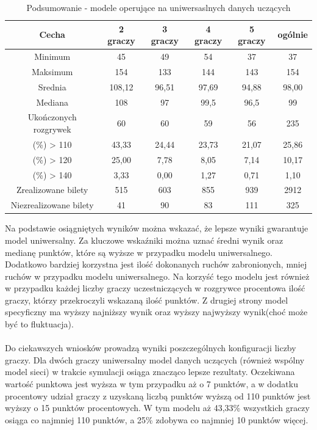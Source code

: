\documentclass[12pt, oneside]{report}
\begin{document}
\begin{table}[h]
	\begin{center}
		\begin{tabular}{| c | c | c | c | c | c |} \hline
			Cecha & 2 graczy & 3 graczy & 4 graczy & 5 graczy & ogólnie \\ \hline
			Minimum & 45 & 49 & 54 & 37 & 37 \\ \hline
			Maksimum & 154 & 133 & 144 & 143 & 154 \\ \hline
			Srednia & 108,12 & 96,51 & 97,69 & 94,88 & 98,00 \\ \hline
			Mediana & 108 & 97 & 99,5 & 96,5 & 99 \\ \hline
			Ukończonych rozgrywek & 60 & 60 & 59 & 56 & 235 \\ \hline
			(\%) > 110 & 43,33 & 24,44 & 23,73 & 21,07 & 25,86 \\ \hline
			(\%) > 120 & 25,00 & 7,78 & 8,05 & 7,14 & 10,17 \\ \hline
			(\%) > 140 & 3,33 & 0,00 & 1,27 & 0,71 & 1,10 \\ \hline
			Zrealizowane bilety & 515 & 603 & 855 & 939 & 2912 \\ \hline
			Niezrealizowane bilety & 41 & 90 & 83 & 111 & 325 \\ \hline
		\end{tabular}
		\caption{Podsumowanie - modele operujące na uniwersaslnych danych uczących}
		\label{table:nn_all_test}
	\end{center}
\end{table}
Na podstawie osiągniętych wyników można wskazać, że lepsze wyniki gwarantuje model uniwersalny. Za kluczowe wskaźniki można uznać średni wynik oraz medianę punktów, które są wyższe w przypadku modelu uniwersalnego. Dodatkowo bardziej korzystna jest ilość dokonanych ruchów zabronionych, mniej ruchów w przypadku modelu uniwersalnego. Na korzyść tego modelu jest również w przypadku każdej liczby graczy uczestniczących w rozgrywce procentowa ilość graczy, którzy przekroczyli wskazaną ilość punktów. Z drugiej strony model specyficzny ma wyższy najniższy wynik oraz wyższy najwyższy wynik(choć może być to fluktuacja). \\ \\ 
Do ciekawszych wniosków prowadzą wyniki poszczególnych konfiguracji liczby graczy. Dla dwóch graczy uniwersalny model danych uczących (również wspólny model sieci) w trakcie symulacji osiąga znacząco lepsze rezultaty. Oczekiwana wartość punktowa jest wyższa w tym przypadku aż o 7 punktów, a w dodatku procentowy udział graczy z uzyskaną liczbą punktów wyższą od 110 punktów jest wyższy o 15 punktów procentowych. W tym modelu aż 43,33\% wszystkich graczy osiąga co najmniej 110 punktów, a 25\% zdobywa co najmniej 10 punktów więcej. 
\end{document}
